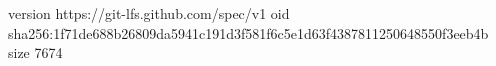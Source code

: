 version https://git-lfs.github.com/spec/v1
oid sha256:1f71de688b26809da5941c191d3f581f6c5e1d63f4387811250648550f3eeb4b
size 7674
